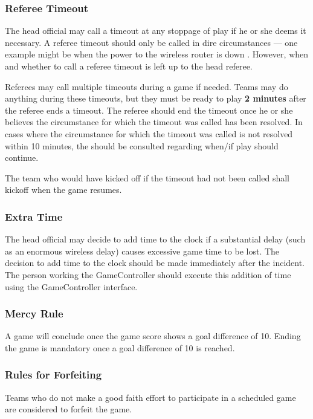 \subsubsection{Referee Timeout}
\label{sec:referee_timeout}
The head official may call a timeout at any stoppage of play if he or she deems it necessary. A referee timeout should only be called in dire circumstances --- one example might be when the power to the wireless router is down . However, when and whether to call a referee timeout is left up to the head referee.

Referees may call multiple timeouts during a game if needed. Teams may do anything during these timeouts, but they must be ready to play \textbf{2 minutes} after the referee ends a timeout. The referee should end the timeout once he or she believes the circumstance for which the timeout was called has been resolved. In cases where the circumstance for which the timeout was called is not resolved within 10 minutes, the  should be consulted regarding when/if play should continue.

The team who would have kicked off if the timeout had not been called shall kickoff when the game resumes.

\subsubsection{Extra Time}
\label{sec:extra_time}
The head official may decide to add time to the clock if a substantial delay (such as an enormous wireless delay) causes excessive game time to be lost. The decision to add time to the clock should be made immediately after the incident. The person working the GameController should execute this addition of time using the GameController interface.

\subsubsection{Mercy Rule}
\label{sec:mercy_rule}
A game will conclude once the game score shows a goal difference of 10. Ending the game is mandatory once a goal difference of 10 is reached.

\subsubsection{Rules for Forfeiting}
\label{sec:forfeit}

Teams who do not make a good faith effort to participate in a scheduled game are considered to forfeit the game.

